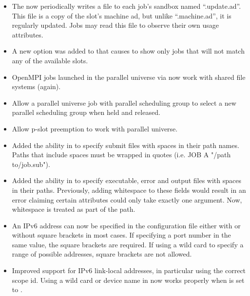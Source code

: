 \begin{itemize}
\item The  now periodically writes a file to each job's
sandbox named ``.update.ad''.  This file is a copy of the slot's machine ad,
but unlike ``.machine.ad'', it is regularly updated.  Jobs may read this
file to observe their own usage attributes.

\item A new option  was added to  that causes  to show
only jobs that will not match any of the available slots.

\item OpenMPI jobs launched in the parallel universe via 
now work with shared file systems (again).

\item Allow a parallel universe job with parallel scheduling group to
select a new parallel scheduling group when held and released.

\item Allow p-slot preemption to work with parallel universe.

\item Added the ability in  to specify submit files with spaces
in their path names. Paths that include spaces must be wrapped in quotes
(i.e. JOB A "/path to/job.sub").

\item Added the ability in  to specify executable, error and
output files with spaces in their paths. Previously, adding whitespace to these
fields would result in an error claiming certain attributes could only take
exactly one argument. Now, whitespace is
treated as part of the path.

\item An IPv6 address can now be specified in the configuration file
either with or without square brackets in most cases.
If specifying a port number in the same value, the square brackets are
required.
If using a wild card to specify a range of possible addresses, square
brackets are not allowed.

\item Improved support for IPv6 link-local addresses, in particular
using the correct scope id.
Using a wild card or device name in  now
works properly when  is set to .


\end{itemize}
